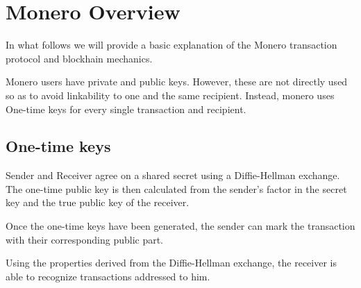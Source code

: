 

\chapter{Monero Overview} 
\label{chap:overview}

In what follows we will provide a basic explanation of the Monero transaction protocol and blockhain mechanics.

Monero users have private and public keys. However, these are not directly used so as to avoid linkability to one and the same recipient. Instead, monero uses One-time keys for every single transaction and recipient.

\section{One-time keys}
\label{sec:generating-one-time-keys}

Sender and Receiver agree on a shared secret using a Diffie-Hellman exchange. The one-time public key is then calculated from the sender's factor in the secret key and the true public key of the receiver.


Once the one-time keys have been generated, the sender can mark the transaction with their corresponding public part.

Using the properties derived from the Diffie-Hellman exchange, the receiver is able to recognize transactions addressed to him. 







